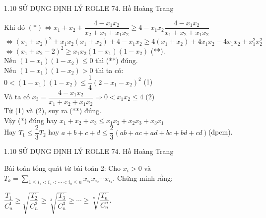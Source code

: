 \begin{frame}{1.10 SỬ DỤNG ĐỊNH LÝ ROLLE \hspace{4cm}  74. Hồ Hoàng Trang}
\begin{block}

    Khi đó $(*)\Leftrightarrow x_1+x_2+\dfrac{4-x_1x_2}{x_2+x_1+x_1x_2} \ge 4-x_1x_2\dfrac{4-x_1x_2}{x_1+x_2+x_1x_2}$
     $\Leftrightarrow (x_1+x_2)^2+x_1x_2(x_1+x_2)+4-x_1x_2\ge 4(x_1+x_2)+4x_1x_2-4x_1x_2+x_1^2x_2^2$\\
     $\Leftrightarrow (x_1+x_2-2)^2 \ge x_1x_2(1-x_1)(1-x_2)$ (**).\\
     \pause
     Nếu $(1-x_1)(1-x_2) \le 0$ thì (**) đúng.\\
     \pause
     Nếu $(1-x_1)(1-x_2) > 0$ thì ta có: $0<(1-x_1)(1-x_2)\le \dfrac{1}{4}(2-x_1-x_2)^2$ (1)\\
     Và ta có $x_3=\dfrac{4-x_1x_2}{x_1+x_2+x_1x_2} \Rightarrow 0<x_1x_2\le 4$ (2)\\
     Từ (1) và (2), suy ra (**) đúng.\\
     \pause
     Vậy (*) đúng hay $x_1+x_2+x_3\le x_1x_2+x_2x_3+x_3x_1$\\
     Hay $T_1 \le \dfrac{2}{3} T_2$ hay $a+b+c+d\le \dfrac{2}{3}(ab+ac+ad+bc+bd+cd)$(đpcm).
     
\end{block}
       
\end{frame}
\begin{frame}{1.10 SỬ DỤNG ĐỊNH LÝ ROLLE \hspace{4cm}  74. Hồ Hoàng Trang}
    \begin{block}{Bài toán tổng quát từ bài toán 2:}
Cho $x_i>0$ và $T_k=\displaystyle \sum_{1\le i_1 < i_2< \cdots <i_k\le n}x_{i_1}x_{i_2}\cdots x_{i_k}$. Chứng minh rằng:
\begin{center}
	$\dfrac{T_1}{C^1_{n}}\ge \sqrt{\dfrac{T_2}{C^2_{n}}}\ge \sqrt[3]{\dfrac{T_3}{C^3_{n}}}\ge \cdots\ge \sqrt[n]{\dfrac{T_n}{C^n_{n}}}$.
\end{center}
\end{block}
\end{frame}

  
 
